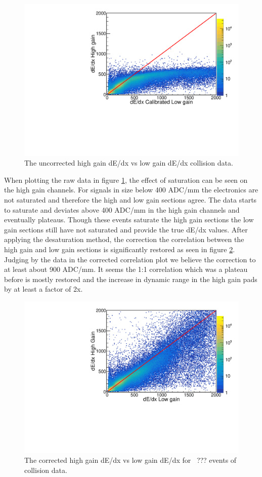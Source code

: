 \documentclass[review]{elsarticle}
\begin{document}
\begin{figure}[H]
\includegraphics[width=\linewidth]{dedxcompare_nodesat}
\caption{The uncorrected high gain dE/dx vs low gain dE/dx collision data.  }
\label{fig:lowvshigh_raw}
\end{figure}
 
When plotting the raw data in figure \ref{fig:lowvshigh_raw}, the effect of saturation can be seen on the high gain channels. For signals in size below 400 ADC/mm the electronics are not saturated and therefore the high and low gain sections agree. The data starts to saturate and deviates above 400 ADC/mm in the high gain channels and eventually plateaus. Though these events saturate the high gain sections the low gain sections still have not saturated and provide the true dE/dx values. After applying the desaturation method, the correction the correlation between the high gain and low gain sections is significantly restored as seen in figure \ref{fig:lowvshigh_desat}. Judging by the data in the corrected correlation plot we believe the correction to at least about 900 ADC/mm. It seems the 1:1 correlation which was a plateau before is mostly restored and the increase in dynamic range in the high gain pads by at least a factor of 2x.  

\begin{figure}[H]
\includegraphics[width=\linewidth]{dedxcompare_new}
\caption{The corrected high gain dE/dx vs low gain dE/dx for ~??? events of collision data.  }
\label{fig:lowvshigh_desat}
\end{figure}
\end{document}
